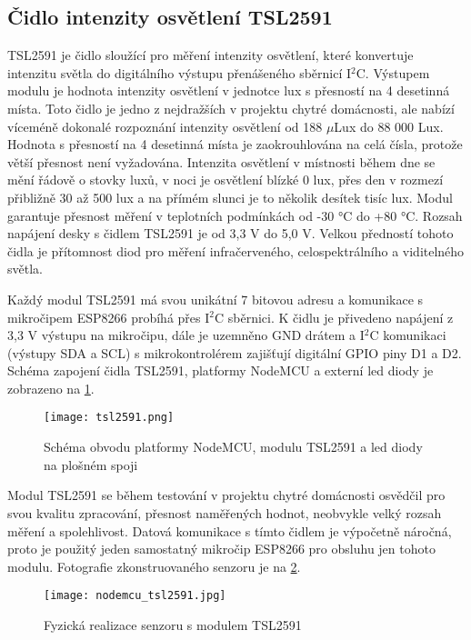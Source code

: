 \subsection{Čidlo intenzity osvětlení TSL2591}

TSL2591 je čidlo sloužící pro měření intenzity osvětlení, které konvertuje intenzitu světla do digitálního výstupu přenášeného sběrnicí I$^2$C. Výstupem modulu je hodnota intenzity osvětlení v jednotce \si{lux} s přesností na 4 desetinná místa. Toto čidlo je jedno z nejdražších v projektu chytré domácnosti, ale nabízí víceméně dokonalé rozpoznání intenzity osvětlení od 188 $\mu$Lux do 88 000 Lux. Hodnota s přesností na 4 desetinná místa je zaokrouhlována na celá čísla, protože větší přesnost není vyžadována. Intenzita osvětlení v místnosti během dne se mění řádově o stovky luxů, v noci je osvětlení blízké 0 \si{lux}, přes den v rozmezí přibližně 30 až 500 \si{lux} a na přímém slunci je to několik desítek tisíc \si{lux}. Modul garantuje přesnost měření v teplotních podmínkách od -30 \si{\degree}C do +80 \si{\degree}C. Rozsah napájení desky s čidlem TSL2591 je od 3,3 V do 5,0 V. Velkou předností tohoto čidla je přítomnost diod pro měření infračerveného, celospektrálního a viditelného světla. \par
Každý modul TSL2591 má svou unikátní 7 bitovou adresu a komunikace s mikročipem ESP8266 probíhá přes I$^2$C sběrnici. K čidlu je přivedeno napájení z 3,3 V výstupu na mikročipu, dále je uzemněno GND drátem a I$^2$C komunikaci (výstupy SDA a SCL) s mikrokontrolérem zajišťují digitální GPIO piny D1 a D2. Schéma zapojení čidla TSL2591, platformy NodeMCU a externí led diody je zobrazeno na \cref{fig:schema_esp_tsl2591}.

\begin{figure}[H]
  \centering
  \texttt{[image: tsl2591.png]}
  \caption{Schéma obvodu platformy NodeMCU, modulu TSL2591 a led diody na plošném spoji}
  \label{fig:schema_esp_tsl2591}
\end{figure}

Modul TSL2591 se během testování v projektu chytré domácnosti osvědčil pro svou kvalitu zpracování, přesnost naměřených hodnot, neobvykle velký rozsah měření a spolehlivost. Datová komunikace s tímto čidlem je výpočetně náročná, proto je použitý jeden samostatný mikročip ESP8266 pro obsluhu jen tohoto modulu. Fotografie zkonstruovaného senzoru je na \cref{fig:nodemcu_tsl2591}.

\begin{figure}[H]
  \centering
  \texttt{[image: nodemcu\_tsl2591.jpg]}
  \caption{Fyzická realizace senzoru s modulem TSL2591}
  \label{fig:nodemcu_tsl2591}
\end{figure} 

